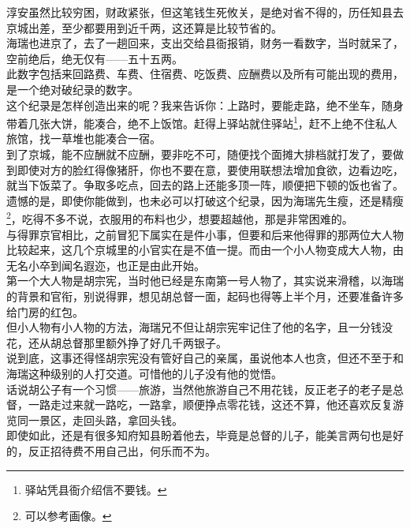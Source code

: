 \begin{multicols}{\theparacolNo}
淳安虽然比较穷困，财政紧张，但这笔钱生死攸关，是绝对省不得的，历任知县去京城出差，至少都要用到近千两，这还算是比较节省的。\\

海瑞也进京了，去了一趟回来，支出交给县衙报销，财务一看数字，当时就呆了，空前绝后，绝无仅有——五十五两。\\

此数字包括来回路费、车费、住宿费、吃饭费、应酬费以及所有可能出现的费用，是一个绝对破纪录的数字。\\

这个纪录是怎样创造出来的呢？我来告诉你：上路时，要能走路，绝不坐车，随身带着几张大饼，能凑合，绝不上饭馆。赶得上驿站就住驿站\footnote{驿站凭县衙介绍信不要钱。}，赶不上绝不住私人旅馆，找一草堆也能凑合一宿。\\

到了京城，能不应酬就不应酬，要非吃不可，随便找个面摊大排档就打发了，要做到即使对方的脸红得像猪肝，你也不要在意，要使用联想法增加食欲，边看边吃，就当下饭菜了。争取多吃点，回去的路上还能多顶一阵，顺便把下顿的饭也省了。\\

遗憾的是，即使你能做到，也未必可以打破这个纪录，因为海瑞先生瘦，还是精瘦\footnote{可以参考画像。}，吃得不多不说，衣服用的布料也少，想要超越他，那是非常困难的。\\

与得罪京官相比，之前冒犯下属实在是件小事，但要和后来他得罪的那两位大人物比较起来，这几个京城里的小官实在是不值一提。而由一个小人物变成大人物，由无名小卒到闻名遐迩，也正是由此开始。\\

第一个大人物是胡宗宪，当时他已经是东南第一号人物了，其实说来滑稽，以海瑞的背景和官衔，别说得罪，想见胡总督一面，起码也得等上半个月，还要准备许多给门房的红包。\\

但小人物有小人物的方法，海瑞兄不但让胡宗宪牢记住了他的名字，且一分钱没花，还从胡总督那里额外挣了好几千两银子。\\

说到底，这事还得怪胡宗宪没有管好自己的亲属，虽说他本人也贪，但还不至于和海瑞这种级别的人打交道。可惜他的儿子没有他的觉悟。\\

话说胡公子有一个习惯——旅游，当然他旅游自己不用花钱，反正老子的老子是总督，一路走过来就一路吃，一路拿，顺便挣点零花钱，这还不算，他还喜欢反复游览同一景区，走回头路，拿回头钱。\\

即使如此，还是有很多知府知县盼着他去，毕竟是总督的儿子，能美言两句也是好的，反正招待费不用自己出，何乐而不为。\\


\end{multicols}
